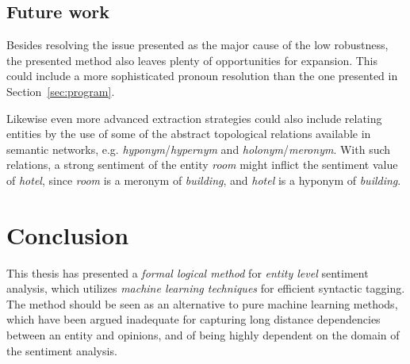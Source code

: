 
\section{Future work}
Besides resolving the issue presented as the major cause of the low robustness, the presented method also leaves plenty of opportunities for expansion. This could include a more sophisticated pronoun resolution than the one presented in Section~\ref{sec:program}.

Likewise even more advanced extraction strategies could also include relating entities by the use of some of the abstract topological relations available in semantic networks, e.g. \emph{hyponym}/\emph{hypernym} and \emph{holonym}/\emph{meronym}. With such relations, a strong sentiment of the entity \emph{room} might inflict the sentiment value of \emph{hotel}, since \emph{room} is a meronym of \emph{building}, and \emph{hotel} is a hyponym of \emph{building}.

\chapter{Conclusion}
\label{chap:conclusion}

This thesis has presented a \emph{formal logical method} for \emph{entity level} sentiment analysis, which utilizes \emph{machine learning techniques} for efficient syntactic tagging. The method should be seen as an alternative to pure machine learning methods, which have been argued inadequate for capturing long distance dependencies between an entity and opinions, and of being highly dependent on the domain of the sentiment analysis.

